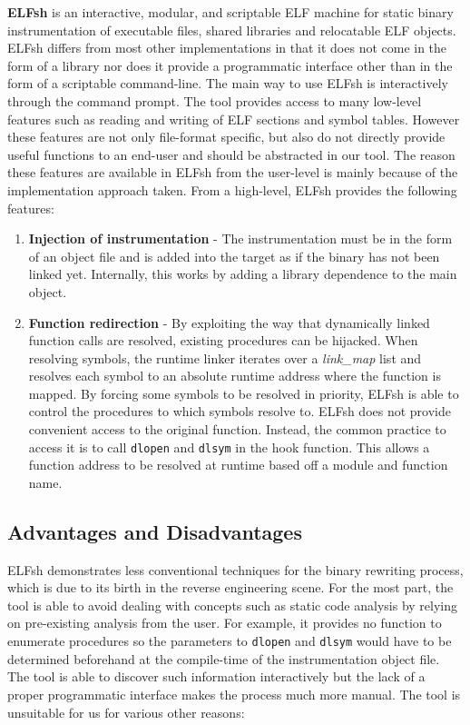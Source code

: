 \textbf{ELFsh} is an interactive, modular, and scriptable ELF machine for static binary instrumentation of executable files, shared libraries and relocatable ELF objects\cite{elfsh}. ELFsh differs from most other implementations in that it does not come in the form of a library nor does it provide a programmatic interface other than in the form of a scriptable command-line. The main way to use ELFsh is interactively through the command prompt. The tool provides access to many low-level features such as reading and writing of ELF sections and symbol tables. However these features are not only file-format specific, but also do not directly provide useful functions to an end-user and should be abstracted in our tool. The reason these features are available in ELFsh from the user-level is mainly because of the implementation approach taken. From a high-level, ELFsh provides the following features:

\begin{enumerate}
 \item \textbf{Injection of instrumentation} - The instrumentation must be in the form of an object file and is added into the target as if the binary has not been linked yet. Internally, this works by adding a library dependence to the main object\cite{cerberus_elf}.
 \item \textbf{Function redirection} - By exploiting the way that dynamically linked function calls are resolved, existing procedures can be hijacked. When resolving symbols, the runtime linker iterates over a \emph{link\_map} list and resolves each symbol to an absolute runtime address where the function is mapped. By forcing some symbols to be resolved in priority, ELFsh is able to control the procedures to which symbols resolve to. ELFsh does not provide convenient access to the original function. Instead, the common practice to access it is to call \texttt{dlopen} and \texttt{dlsym} in the hook function. This allows a function address to be resolved at runtime based off a module and function name.

\end{enumerate}

\subsection{Advantages and Disadvantages}

ELFsh demonstrates less conventional techniques for the binary rewriting process, which is due to its birth in the reverse engineering scene. For the most part, the tool is able to avoid dealing with concepts such as static code analysis by relying on pre-existing analysis from the user. For example, it provides no function to enumerate procedures so the parameters to \texttt{dlopen} and \texttt{dlsym} would have to be determined beforehand at the compile-time of the instrumentation object file. The tool is able to discover such information interactively but the lack of a proper programmatic interface makes the process much more manual. The tool is unsuitable for us for various other reasons:

